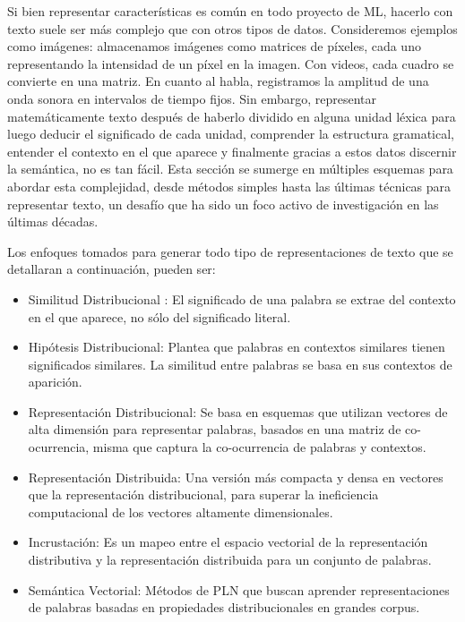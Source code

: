 Si bien representar características es común en todo proyecto de ML, hacerlo con texto suele ser más complejo que con otros tipos de datos. Consideremos ejemplos como imágenes: almacenamos imágenes como matrices de píxeles, cada uno representando la intensidad de un píxel en la imagen. Con videos, cada cuadro se convierte en una matriz. En cuanto al habla, registramos la amplitud de una onda sonora en intervalos de tiempo fijos. Sin embargo, representar matemáticamente texto después de haberlo dividido en alguna unidad léxica para luego deducir el significado de cada unidad, comprender la estructura gramatical, entender el contexto en el que aparece y finalmente gracias a estos datos discernir la semántica, no es tan fácil. Esta sección  se sumerge en múltiples esquemas para abordar esta complejidad, desde métodos simples hasta las últimas técnicas para representar texto, un desafío que ha sido un foco activo de investigación en las últimas décadas.

Los enfoques tomados para generar todo tipo de representaciones de texto que se detallaran a continuación, pueden ser: 

\begin{itemize}

	\item Similitud Distribucional : El significado de una palabra se extrae del contexto en el que aparece, no sólo del significado literal.

	\item Hipótesis Distribucional: Plantea que palabras en contextos similares tienen significados similares. La similitud entre palabras se basa en sus contextos de aparición.
	
	\item Representación Distribucional: Se basa en esquemas que utilizan vectores de alta dimensión para representar palabras, basados en una matriz de co-ocurrencia, misma que captura la co-ocurrencia de palabras y contextos.
	
	\item Representación Distribuida: Una versión más compacta y densa en vectores que la representación distribucional, para superar la ineficiencia computacional de los vectores altamente dimensionales.

	\item Incrustación: Es un mapeo entre el espacio vectorial de la representación distributiva y la representación distribuida para un conjunto de palabras.
	
	\item Semántica Vectorial: Métodos de PLN que buscan aprender representaciones de palabras basadas en propiedades distribucionales en grandes corpus.
\end{itemize}

